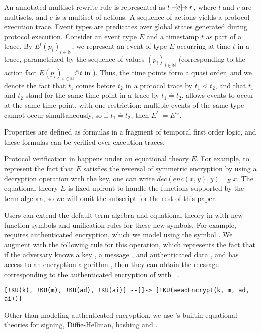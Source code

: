 An annotated multiset rewrite-rule is represented as
$l \ifarrow[e] r$, where $l$ and $r$ are multisets, and $e$ is
a multiset of actions.
%
A sequence of actions yields a protocol execution trace.
%
Event types are predicates over global states generated during protocol 
execution.
%
Consider an event type $E$ and a timestamp $t$ as part of a trace.
%
By $E^{t}(p_i)_{i\in\mathbb{N}}$, we represent an event of type $E$ occurring
at time $t$ in a trace, parametrized by the sequence of values
$(p_i)_{i\in\mathbb{N}}$
(corresponding to the action fact $E(p_i)_{i\in\mathbb{N}}@t$ in \mTamarin).
%
Thus, the time points form a quasi order, and we denote the fact that
$t_{1}$ comes before $t_{2}$ in a protocol trace by
$t_{1} \lessdot t_{2}$, and that $t_{1}$ and $t_{2}$ stand for the same
time point in a trace by $t_{1} \doteq t_{2}$.
%
\mTamarin{} allows events to occur at the same time point, with one
restriction: multiple events of the same type cannot occur simultaneously,
so if $t_{1} \doteq t_{2}$, then $E^{t_{1}} = E^{t_{2}}$.
%

Properties are defined as formulas in a fragment of temporal first order logic,
and these formulas can be verified over execution traces.
%

Protocol verification in \mTamarin{} happens under an equational theory $E$.
%
For example, to represent the fact that $E$ satisfies the reversal of
symmetric encryption by using a decryption operation with the key,
one can write $\textit{dec}(\textit{enc}(x, y), y) =_{E} x$.
%
The equational theory $E$ is fixed upfront to handle the functions supported 
by
the term algebra, so we will omit the subscript for the rest of this paper.
%

Users can extend the default term algebra and equational theory in
\mTamarin{} with new function symbols and unification rules for these new 
symbols.
%
For example, \mEdhoc{} requires authenticated encryption, which we model 
using
the symbol .
%
We augment \mTamarin{} with the following rule for this operation,
which represents the fact that if the adversary knows a key ,
a message , and authenticated data ,
and has access to an encryption algorithm ,
then they can obtain the message corresponding to the authenticated 
encryption
of  with ~\cite{Norr21}.
%
{\footnotesize
\begin{verbatim}
[!KU(k), !KU(m), !KU(ad), !KU(ai)] --[]-> [!KU(aeadEncrypt(k, m, ad, ai))]
\end{verbatim}}
%
Other than modeling authenticated encryption, we use \mTamarin{}'s builtin
equational theories for signing, Diffie-Hellman, hashing and \mXor{}.
%

